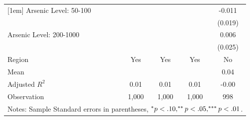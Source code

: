 \begin{table}[htbp]
\begin{tabular}{l*{4}{c}}
[1em]
Arsenic Level: 50-100&                     &                     &                     &      -0.011         \\
                    &                     &                     &                     &     (0.019)         \\
[1em]
Arsenic Level: 200-1000&                     &                     &                     &       0.006         \\
                    &                     &                     &                     &     (0.025)         \\
[1em]
Region              &         Yes         &         Yes         &         Yes         &          No         \\
\hline
Mean                &                     &                     &                     &        0.04         \\
Adjusted \(R^{2}\)  &        0.01         &        0.01         &        0.01         &       -0.00         \\
Observation         &       1,000         &       1,000         &       1,000         &         998         \\
\hline\hline
\multicolumn{5}{p{0.6\linewidth}}{\footnotesize Notes: Sample Standard errors in parentheses, $\sym{*} p<.10,\sym{**} p<.05,\sym{***} p<.01$.}\\
\end{tabular}
\end{table}
